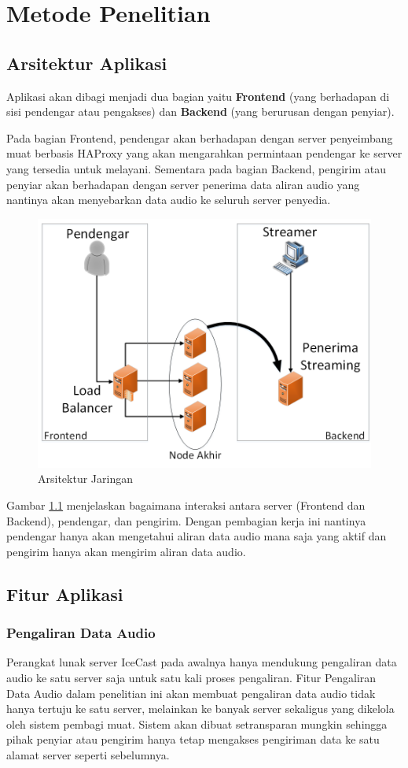 \chapter{Metode Penelitian}

\section{Arsitektur Aplikasi}

Aplikasi akan dibagi menjadi dua bagian yaitu \textbf{Frontend} (yang berhadapan di sisi pendengar atau pengakses) dan \textbf{Backend} (yang berurusan dengan penyiar). 

Pada bagian Frontend, pendengar akan berhadapan dengan server penyeimbang muat berbasis HAProxy yang akan mengarahkan permintaan pendengar ke server yang tersedia untuk melayani. Sementara pada bagian Backend, pengirim atau penyiar akan berhadapan dengan server penerima data aliran audio yang nantinya akan menyebarkan data audio ke seluruh server penyedia.

\begin{figure}
    \centering
    \includegraphics[width=0.5\linewidth]{arsitektur}
    \caption{Arsitektur Jaringan}
    \label{fig:arsitektur}
\end{figure}

Gambar \ref{fig:arsitektur}  menjelaskan bagaimana interaksi antara server (Frontend dan Backend), pendengar, dan pengirim. Dengan pembagian kerja ini nantinya pendengar hanya akan mengetahui aliran data audio mana saja yang aktif dan pengirim hanya akan mengirim aliran data audio.

\section{Fitur Aplikasi}
\subsection{Pengaliran Data Audio}

Perangkat lunak server IceCast pada awalnya hanya mendukung pengaliran data audio ke satu server saja untuk satu kali proses pengaliran. Fitur Pengaliran Data Audio dalam penelitian ini akan membuat pengaliran data audio tidak hanya tertuju ke satu server, melainkan ke banyak server sekaligus yang dikelola oleh sistem pembagi muat. Sistem akan dibuat setransparan mungkin sehingga pihak penyiar atau pengirim hanya tetap mengakses pengiriman data ke satu alamat server seperti sebelumnya.

